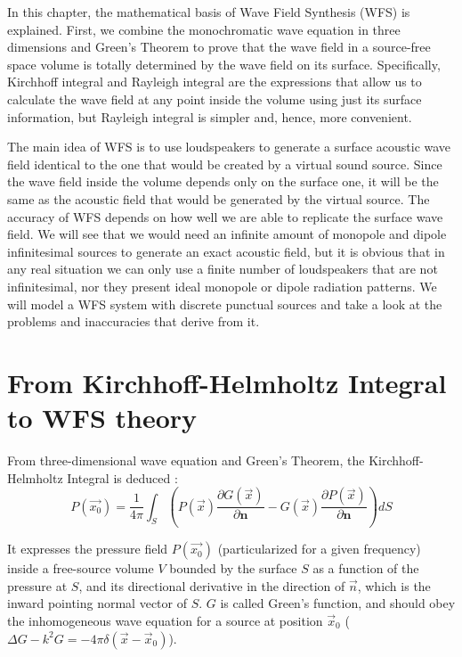 In this chapter, the mathematical basis of Wave Field Synthesis (WFS) is explained. First, we combine the monochromatic wave equation in three dimensions and Green's Theorem to prove that the wave field in a source-free space volume is totally determined by the wave field on its surface. Specifically, Kirchhoff integral and Rayleigh integral are the expressions that allow us to calculate the wave field at any point inside the volume using just its surface information, but Rayleigh integral is simpler and, hence, more convenient. %

The main idea of WFS is to use loudspeakers to generate a surface acoustic wave field identical to the one that would be created by a virtual sound source. Since the wave field inside the volume depends only on the surface one, it will be the same as the acoustic field that would be generated by the virtual source. The accuracy of WFS depends on how well we are able to replicate the surface wave field. We will see that we would need an infinite amount of monopole and dipole infinitesimal sources to generate an exact acoustic field, but it is obvious that in any real situation we can only use a finite number of loudspeakers that are not infinitesimal, nor they present ideal monopole or dipole radiation patterns. We will model a WFS system with discrete punctual sources and take a look at the problems and inaccuracies that derive from it.

\section{From Kirchhoff-Helmholtz Integral to WFS theory}
From three-dimensional wave equation and Green's Theorem, the Kirchhoff-Helmholtz Integral is deduced \cite{BerkhoutSeismic} \cite{Verheijen}:
\begin{equation}
P(\vec{x_0}) = \frac{1}{4\pi} \int_{S} \left(P(\vec{x})\frac{\partial G(\vec{x})}{\partial \mathbf{n}} - G(\vec{x}) \frac{\partial P(\vec{x})}{\partial \mathbf{n}} \right) dS
\label{KirchhoffHelmholtz}
\end{equation}

It expresses the pressure field $P(\vec{x_0})$ (particularized for a given frequency) inside a free-source volume $V$ bounded by the surface $S$ as a function of the pressure at $S$, and its directional derivative in the direction of $\vec{n}$, which is the inward pointing normal vector of $S$. $G$ is called Green's function, and should obey the inhomogeneous wave equation for a source at position $\vec{x}_0$ ($\Delta G - k^2 G = -4\pi\delta(\vec{x} - \vec{x}_0)$).

